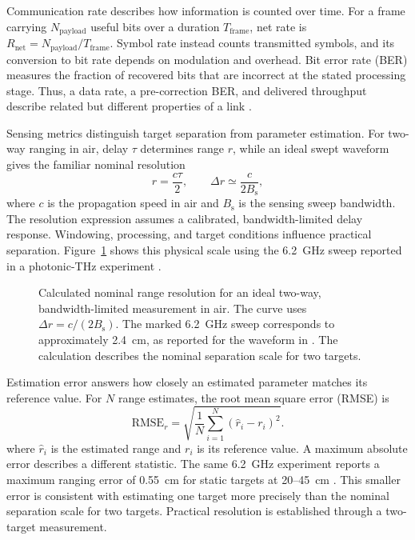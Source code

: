 Communication rate describes how information is counted over time.
For a frame carrying $N_{\mathrm{payload}}$ useful bits over a duration
$T_{\mathrm{frame}}$, net rate is
$R_{\mathrm{net}}=N_{\mathrm{payload}}/T_{\mathrm{frame}}$.
Symbol rate instead counts transmitted symbols, and its conversion to bit
rate depends on modulation and overhead. Bit error rate (BER) measures the
fraction of recovered bits that are incorrect at the stated processing stage.
Thus, a data rate,
a pre-correction BER, and delivered throughput describe related but different
properties of a link
\cite{OISAC_SCR01054,OISAC_SCR01180}.

Sensing metrics distinguish target separation from parameter estimation.
For two-way ranging in air, delay $\tau$ determines range $r$, while an
ideal swept waveform gives the familiar nominal resolution
\begin{equation}
r=\frac{c\tau}{2},
\qquad
\Delta r \simeq \frac{c}{2B_{\mathrm{s}}},
\label{eq:range_and_resolution}
\end{equation}
where $c$ is the propagation speed in air and $B_{\mathrm{s}}$ is the sensing
sweep bandwidth. The resolution
expression assumes a calibrated, bandwidth-limited delay response.
Windowing, processing, and target conditions influence practical separation.
Figure~\ref{fig:bandwidth_resolution} shows this physical scale using the
6.2~GHz sweep reported in a photonic-THz experiment
\cite{OISAC_SCR00083}.

\begin{figure}[!t]
\centering

\caption{Calculated nominal range resolution for an ideal two-way,
bandwidth-limited measurement in air. The curve uses
$\Delta r=c/(2B_{\mathrm{s}})$. The marked 6.2~GHz sweep corresponds to
approximately 2.4~cm, as reported for the waveform in
\cite{OISAC_SCR00083}. The calculation describes the nominal separation scale
for two targets.}
\label{fig:bandwidth_resolution}
\end{figure}

Estimation error answers how closely an estimated parameter matches its
reference value. For $N$ range estimates, the root mean square error (RMSE) is
\begin{equation}
\mathrm{RMSE}_{r}=
\sqrt{\frac{1}{N}\sum_{i=1}^{N}(\hat r_i-r_i)^2}.
\label{eq:ranging_rmse}
\end{equation}
where $\hat r_i$ is the estimated range and $r_i$ is its reference value.
A maximum absolute error describes a different statistic. The same
6.2~GHz experiment reports a maximum ranging error of 0.55~cm for static
targets at 20--45~cm \cite{OISAC_SCR00083}. This smaller error is consistent
with estimating one target more precisely than the nominal separation scale
for two targets. Practical resolution is established through a two-target
measurement.


